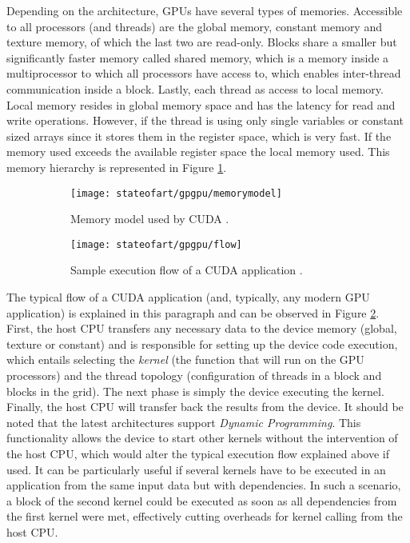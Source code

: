 Depending on the architecture, GPUs have several types of memories.
Accessible to all processors (and threads) are the global memory, constant memory and texture memory, of which the last two are read-only.
Blocks share a smaller but significantly faster memory called shared memory, which is a memory inside a multiprocessor to which all processors have access to, which enables inter-thread communication inside a block.
Lastly, each thread as access to local memory.
Local memory resides in global memory space and has the latency for read and write operations.
However, if the thread is using only single variables or constant sized arrays since it stores them in the register space, which is very fast.
If the memory used exceeds the available register space the local memory used.
This memory hierarchy is represented in Figure \ref{fig:memorymodel}.


\begin{figure}[!ht]
    \centering
    \begin{subfigure}[b]{0.45\textwidth}
        \centering
        \texttt{[image: stateofart/gpgpu/memorymodel]}
        \caption{Memory model used by CUDA \cite{Nvidia2014}.}
        \label{fig:memorymodel}
    \end{subfigure}
    \hfill
    \begin{subfigure}[b]{0.45\textwidth}
        \centering
        \texttt{[image: stateofart/gpgpu/flow]}
        \caption{Sample execution flow of a CUDA application \cite{Nvidia2014}.}
        \label{fig:cudaflow}
    \end{subfigure}
    \caption{}
    \label{fig:cuda fig2}
\end{figure}

The typical flow of a CUDA application (and, typically, any modern GPU application) is explained in this paragraph and can be observed in Figure \ref{fig:cudaflow}.
First, the host CPU transfers any necessary data to the device memory (global, texture or constant) and is responsible for setting up the device code execution, which entails selecting the \emph{kernel} (the function that will run on the GPU processors) and the thread topology (configuration of threads in a block and blocks in the grid).
The next phase is simply the device executing the kernel.
Finally, the host CPU will transfer back the results from the device.
It should be noted that the latest architectures support \emph{Dynamic Programming}.
This functionality allows the device to start other kernels without the intervention of the host CPU, which would alter the typical execution flow explained above if used.
It can be particularly useful if several kernels have to be executed in an application from the same input data but with dependencies.
In such a scenario, a block of the second kernel could be executed as soon as all dependencies from the first kernel were met, effectively cutting overheads for kernel calling from the host CPU.

